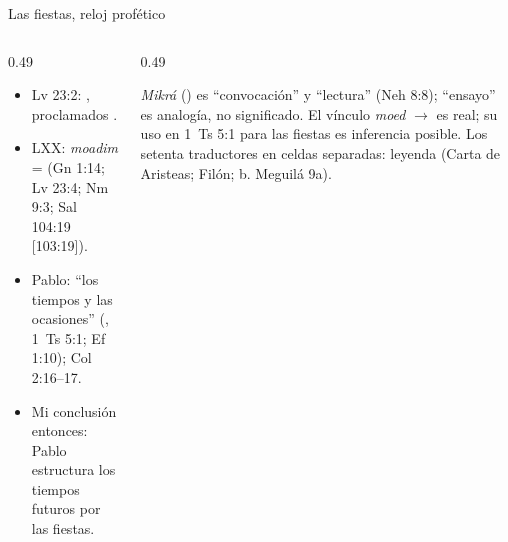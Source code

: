 \begin{frame}{Las fiestas, reloj profético}
\begin{columns}[t,onlytextwidth]
\begin{column}{0.49\textwidth}\scriptsize
{}
\begin{itemize}
\item Lv 23:2: , proclamados .
\item LXX: \emph{moadim} =  (Gn 1:14; Lv 23:4; Nm 9:3; Sal 104:19 [103:19]).
\item Pablo: ``los tiempos y las ocasiones'' (, 1~Ts 5:1; Ef 1:10); Col 2:16--17.
\item Mi conclusión entonces: Pablo estructura los tiempos futuros por las fiestas.
\end{itemize}
\end{column}
\begin{column}{0.49\textwidth}
\begin{tcolorbox}[colback=mostaza!12,colframe=mostaza!80!tierraroja,boxrule=0.6pt,arc=2pt,fontupper=\scriptsize,title={\scriptsize Precisión},coltitle=caferojizo,colbacktitle=mostaza!35]
\emph{Mikrá} () es ``convocación'' y ``lectura'' (Neh 8:8); ``ensayo'' es analogía, no significado. El vínculo \emph{moed} $\rightarrow$  es real; su uso en 1~Ts 5:1 para las fiestas es inferencia posible. Los setenta traductores en celdas separadas: leyenda (Carta de Aristeas; Filón; b. Meguilá 9a).
\end{tcolorbox}
\end{column}
\end{columns}
\end{frame}

